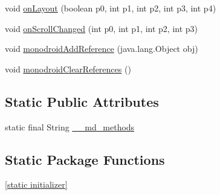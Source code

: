 \begin{CompactItemize}
\item 
void \hyperlink{classmd5b60ffeb829f638581ab2bb9b1a7f4f3f_1_1_scroll_view_renderer_3d67ff8055c54f0f7e8b83c02e1f3e5b}{onLayout} (boolean p0, int p1, int p2, int p3, int p4)
\item 
void \hyperlink{classmd5b60ffeb829f638581ab2bb9b1a7f4f3f_1_1_scroll_view_renderer_75785a2000e6b0bdede6664ea1ab230c}{onScrollChanged} (int p0, int p1, int p2, int p3)
\item 
void \hyperlink{classmd5b60ffeb829f638581ab2bb9b1a7f4f3f_1_1_scroll_view_renderer_f8ce9ea3774616bef86ff56598273b4f}{monodroidAddReference} (java.lang.Object obj)
\item 
void \hyperlink{classmd5b60ffeb829f638581ab2bb9b1a7f4f3f_1_1_scroll_view_renderer_ade95cf62b886c7d7630bd6d29119ed1}{monodroidClearReferences} ()
\end{CompactItemize}
\subsection*{Static Public Attributes}
\begin{CompactItemize}
\item 
static final String \hyperlink{classmd5b60ffeb829f638581ab2bb9b1a7f4f3f_1_1_scroll_view_renderer_b2b998afe39872cdd0f9f5caea97ed1c}{\_\-\_\-md\_\-methods}
\end{CompactItemize}
\subsection*{Static Package Functions}
\begin{CompactItemize}
\item 
\hyperlink{classmd5b60ffeb829f638581ab2bb9b1a7f4f3f_1_1_scroll_view_renderer_4c489a65814fa0175b2229056c3ee642}{\mbox{[}static initializer\mbox{]}}
\end{CompactItemize}
